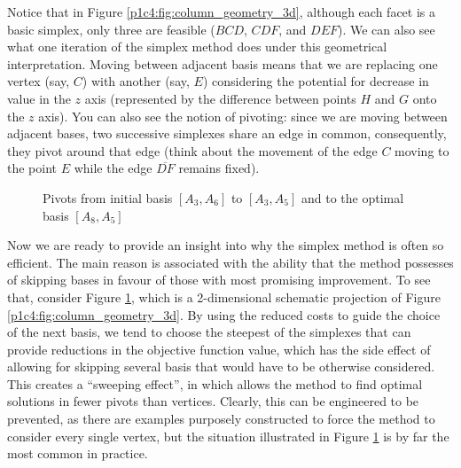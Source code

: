 Notice that in Figure \ref{p1c4:fig:column_geometry_3d}, although each facet is a basic simplex, only three are feasible ($BCD$, $CDF$, and $DEF$). We can also see what one iteration of the simplex method does under this geometrical interpretation. Moving between adjacent basis means that we are replacing one vertex (say, $C$) with another (say, $E$) considering the potential for decrease in value in the $z$ axis (represented by the difference between points $H$ and $G$ onto the $z$ axis). You can also see the notion of pivoting: since we are moving between adjacent bases, two successive simplexes share an edge in common, consequently, they pivot around that edge (think about the movement of the edge $C$ moving to the point $E$ while the edge $\overline{DF}$ remains fixed).

\begin{figure}[h]
	\caption{Pivots from initial basis $[A_3, A_6]$ to $[A_3, A_5]$ and to the optimal basis $[A_8, A_5]$} \label{p1c4:fig:column_geometry_projection}
\end{figure}		
 
Now we are ready to provide an insight into why the simplex method is often so efficient. The main reason is associated with the ability that the method possesses of skipping bases in favour of those with most promising improvement. To see that, consider Figure \ref{p1c4:fig:column_geometry_projection}, which is a 2-dimensional schematic projection of Figure \ref{p1c4:fig:column_geometry_3d}. By using the reduced costs to guide the choice of the next basis, we tend to choose the steepest of the simplexes that can provide reductions in the objective function value, which has the side effect of allowing for skipping several basis that would have to be otherwise considered. This creates a ``sweeping effect'', in which allows the method to find optimal solutions in fewer pivots than vertices. Clearly, this can be engineered to be prevented, as there are examples purposely constructed to force the method to consider every single vertex, but the situation illustrated in Figure \ref{p1c4:fig:column_geometry_projection} is by far the most common in practice.  

